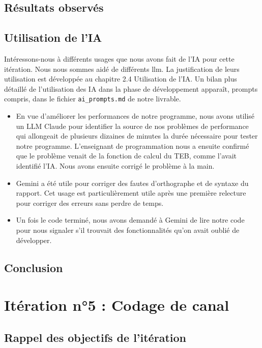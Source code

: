 \documentclass[a4paper,12pt]{report}
\begin{document}
\section{Résultats observés}

\section{Utilisation de l'IA}
Intéressons-nous à différents usages que nous avons fait de l'IA pour cette itération. Nous nous sommes aidé de différents \gls{llm}. La justification de leurs utilisation est développée au chapitre 2.4 Utilisation de l'IA.
Un bilan plus détaillé de l'utilisation des IA dans la phase de développement apparaît, prompts compris, dans le fichier \verb|ai_prompts.md| de notre livrable.

\begin{itemize}
    \item En vue d'améliorer les performances de notre programme, nous avons utilisé un LLM Claude pour identifier la source de nos problèmes de performance qui allongeait de plusieurs dizaines de minutes la durée nécessaire pour tester notre programme. L'enseignant de programmation nous a ensuite confirmé que le problème venait de la fonction de calcul du TEB, comme l'avait identifié l'IA. Nous avons ensuite corrigé le problème à la main.
    \item Gemini a été utile pour corriger des fautes d'orthographe et de syntaxe du rapport. Cet usage est particulièrement utile après une première relecture pour corriger des erreurs sans perdre de temps.
    \item Un fois le code terminé, nous avons demandé à Gemini de lire notre code pour nous signaler s'il trouvait des fonctionnalités qu'on avait oublié de développer.
\end{itemize}

\section{Conclusion}

\chapter{Itération n°5 : Codage de canal}
\thispagestyle{main}

\section{Rappel des objectifs de l'itération}
\end{document}
